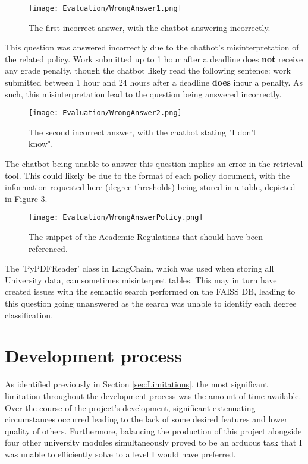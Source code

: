 \begin{figure}[H]
    \centering
    \texttt{[image: Evaluation/WrongAnswer1.png]}
    \caption{The first incorrect answer, with the chatbot answering incorrectly. \label{fig:WrongAnswer1}}
\end{figure}

\noindent This question was answered incorrectly due to the chatbot's misinterpretation of the related policy. Work submitted up to 
1 hour after a deadline does \textbf{not} receive any grade penalty, though the chatbot likely read the following sentence: work submitted between 1 hour and 
24 hours after a deadline \textbf{does} incur a penalty. As such, this misinterpretation lead to the question being answered incorrectly.

\begin{figure}[H]
    \centering
    \texttt{[image: Evaluation/WrongAnswer2.png]}
    \caption{The second incorrect answer, with the chatbot stating "I don't know". \label{fig:WrongAnswer2}}
\end{figure}

\noindent The chatbot being unable to answer this question implies an error in the retrieval tool. This could likely be due to the 
format of each policy document, with the information requested here (degree thresholds) being stored in a table, depicted in Figure 
\ref{fig:WrongAnswer2Snippet}.

\begin{figure}[H]
    \centering
    \texttt{[image: Evaluation/WrongAnswerPolicy.png]}
    \caption{The snippet of the Academic Regulations that should have been referenced. \autocite{bcuPoliciesProcedures} \label{fig:WrongAnswer2Snippet}}
\end{figure}

\noindent The 'PyPDFReader' class in LangChain, which was used when storing all University data, can sometimes misinterpret tables. 
This may in turn have created issues with the semantic search performed on the FAISS DB, leading to this question going unanswered as 
the search was unable to identify each degree classification.



\section{Development process}\label{sec:EvalProcess}
As identified previously in Section \ref{sec:Limitations}, the most significant limitation throughout the development process 
was the amount of time available. Over the course of the project's development, significant extenuating circumstances occurred 
leading to the lack of some desired features and lower quality of others. Furthermore, balancing the production of this project 
alongside four other university modules simultaneously proved to be an arduous task that I was unable to efficiently solve to 
a level I would have preferred.

